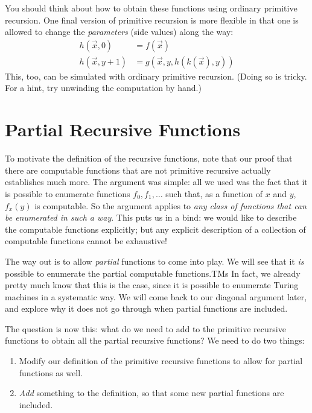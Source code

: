 \documentclass[10pt,a4paper]{article}
\theoremstyle{plain}
\theoremstyle{definition}
\theoremstyle{remark}
\newcommand*{\olfileid}[3]{}
\newcommand*{\olsection}[1]{\section*{#1}}
\providecommand{\iftag}[1]{#1}
\begin{document}
You should think about how to obtain these functions using ordinary
primitive recursion. One final version of primitive recursion is more
flexible in that one is allowed to change the \emph{parameters} (side
values) along the way:
\begin{align*}
h(\vec x, 0) & = f(\vec x) \\
h(\vec x, y+1) & = g(\vec x, y, h(k(\vec x), y))
\end{align*}
This, too, can be simulated with ordinary primitive recursion. (Doing
so is tricky. For a hint, try unwinding the computation by hand.)





\olfileid{cmp}{rec}{par}
\olsection{Partial Recursive Functions}


To motivate the definition of the recursive functions, note that our
proof that there are computable functions that are not primitive
recursive actually establishes much more. The argument was
simple: all we used was the fact that it is possible to enumerate
functions $f_0,f_1,\dots$ such that, as a function of $x$ and $y$,
$f_x(y)$ is computable. So the argument applies to \emph{any class of
  functions that can be enumerated in such a way}. This puts us in a
bind: we would like to describe the computable functions explicitly;
but any explicit description of a collection of computable functions
cannot be exhaustive!

The way out is to allow \emph{partial} functions to come into play. We
will see that it \emph{is} possible to enumerate the partial
computable functions.\iftag{TMs}{ In fact, we already pretty much know
  that this is the case, since it is possible to enumerate Turing
  machines in a systematic way.}{} We will come back to our diagonal
argument later, and explore why it does not go through when partial
functions are included.

The question is now this: what do we need to add to the primitive
recursive functions to obtain all the partial recursive functions? We
need to do two things:
\begin{enumerate}
\item Modify our definition of the primitive recursive functions to
  allow for partial functions as well.
\item \emph{Add} something to the definition, so that some new partial
  functions are included.
\end{enumerate}
\end{document}
